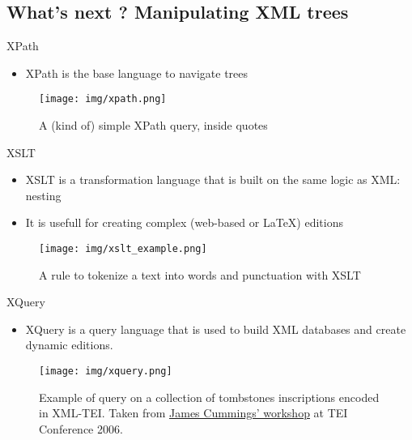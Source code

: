 \documentclass[11pt,aspectratio=1610]{beamer}
\begin{document}
\subsection{What's next ? Manipulating XML trees}
\begin{frame}{XPath}
\begin{itemize}
\item XPath is the base language to navigate trees
\end{itemize}
\begin{center}
\begin{figure}
\texttt{[image: img/xpath.png]}
\caption{A (kind of) simple XPath query, inside quotes}
\end{figure}
\end{center}
\end{frame}


\begin{frame}{XSLT}
\begin{itemize}
\item XSLT is a transformation language that is built on the same logic as XML: nesting
\item It is usefull for creating complex (web-based or \LaTeX) editions
\end{itemize}
\begin{center}
\begin{figure}
\texttt{[image: img/xslt\_example.png]}
\caption{A rule to tokenize a text into words and punctuation with XSLT}
\end{figure}
\end{center}
\end{frame}

\begin{frame}{XQuery}
\begin{itemize}
\item XQuery is a query language that is used to build XML databases and create dynamic editions.
\end{itemize}
\begin{center}
\begin{figure}
\texttt{[image: img/xquery.png]}
\caption{Example of query on a collection of tombstones inscriptions encoded in XML-TEI. Taken from \href{https://tei-c.org/Vault/Talks/OUCS/2006-02/exercise-xquery.pdf}{James Cummings' workshop} at TEI Conference 2006.}
\end{figure}
\end{center}
\end{frame}
\end{document}
